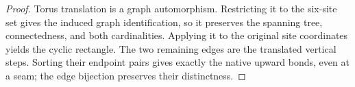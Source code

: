 \begin{proof}\leanok
    Torus translation is a graph automorphism. Restricting it to the six-site
    set gives the induced graph identification, so it preserves
    the spanning tree, connectedness, and both cardinalities.
    Applying it to the original site coordinates yields the cyclic rectangle.
    The two remaining edges are the translated vertical steps. Sorting their
    endpoint pairs gives exactly the native upward bonds, even at a seam;
    the edge bijection preserves their distinctness.
\end{proof}

